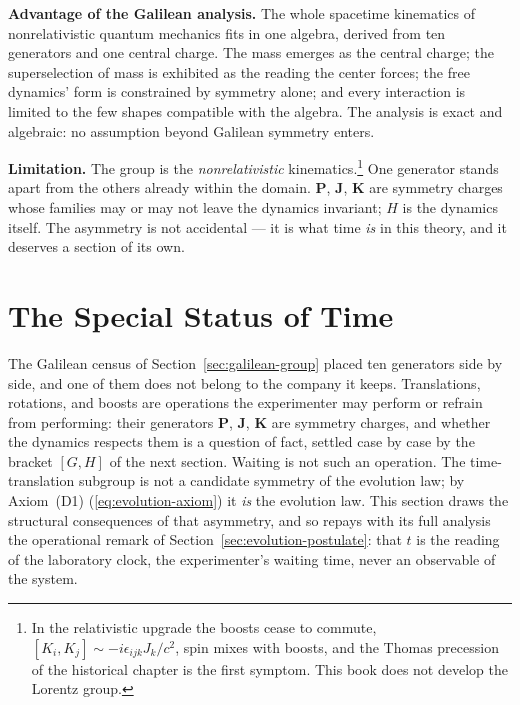 \medskip\noindent\textbf{Advantage of the Galilean analysis.} The whole spacetime kinematics of nonrelativistic quantum mechanics fits in one algebra, derived from ten generators and one central charge. The mass emerges as the central charge; the superselection of mass is exhibited as the reading the center forces; the free dynamics' form is constrained by symmetry alone; and every interaction is limited to the few shapes compatible with the algebra. The analysis is exact and algebraic: no assumption beyond Galilean symmetry enters.

\medskip\noindent\textbf{Limitation.} The group is the \emph{nonrelativistic} kinematics.\footnote{In the relativistic upgrade the boosts cease to commute, $[K_i,K_j]\sim-i\epsilon_{ijk}J_k/c^{2}$, spin mixes with boosts, and the Thomas precession of the historical chapter is the first symptom. This book does not develop the Lorentz group.} One generator stands apart from the others already within the domain. $\bm P$, $\bm J$, $\bm K$ are symmetry charges whose families may or may not leave the dynamics invariant; $H$ is the dynamics itself. The asymmetry is not accidental --- it is what time \emph{is} in this theory, and it deserves a section of its own.

\section{The Special Status of Time}
\label{sec:time-status}

The Galilean census of Section~\ref{sec:galilean-group} placed ten generators side by side, and one of them does not belong to the company it keeps. Translations, rotations, and boosts are operations the experimenter may perform or refrain from performing: their generators $\bm P$, $\bm J$, $\bm K$ are symmetry charges, and whether the dynamics respects them is a question of fact, settled case by case by the bracket $[G,H]$ of the next section. Waiting is not such an operation. The time-translation subgroup is not a candidate symmetry of the evolution law; by Axiom~(D1) (\eqref{eq:evolution-axiom}) it \emph{is} the evolution law. This section draws the structural consequences of that asymmetry, and so repays with its full analysis the operational remark of Section~\ref{sec:evolution-postulate}: that $t$ is the reading of the laboratory clock, the experimenter's waiting time, never an observable of the system.

